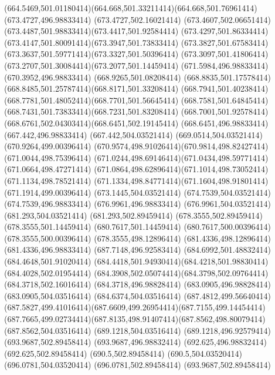 {{	\curveto(664.5469,501.01180414)(664.668,501.33211414)(664.668,501.76961414)
	\closepath
	\moveto(673.4727,496.98833414)
	\lineto(673.4727,502.16021414)
	\curveto(673.4607,502.06651414)(673.4487,501.98833414)(673.4417,501.92584414)
	\curveto(673.4297,501.86334414)(673.4147,501.80091414)(673.3947,501.73833414)
	\curveto(673.3827,501.67583414)(673.3637,501.59771414)(673.3327,501.50396414)
	\curveto(673.3097,501.41806414)(673.2707,501.30084414)(673.2077,501.14459414)
	\lineto(671.5984,496.98833414)
	\lineto(670.3952,496.98833414)
	\lineto(668.9265,501.08208414)
	\curveto(668.8835,501.17578414)(668.8485,501.25787414)(668.8171,501.33208414)
	\curveto(668.7941,501.40238414)(668.7781,501.48052414)(668.7701,501.56645414)
	\curveto(668.7581,501.64845414)(668.7431,501.73833414)(668.7231,501.83208414)
	\curveto(668.7001,501.92578414)(668.6761,502.04303414)(668.6451,502.19145414)
	\lineto(668.6451,496.98833414)
	\lineto(667.442,496.98833414)
	\lineto(667.442,504.03521414)
	\lineto(669.0514,504.03521414)
	\lineto(670.9264,499.00396414)
	\curveto(670.9574,498.91026414)(670.9814,498.82427414)(671.0044,498.75396414)
	\curveto(671.0244,498.69146414)(671.0434,498.59771414)(671.0664,498.47271414)
	\curveto(671.0864,498.62896414)(671.1014,498.73052414)(671.1134,498.78521414)
	\curveto(671.1334,498.84771414)(671.1604,498.91801414)(671.1914,499.00396414)
	\lineto(673.1445,504.03521414)
	\lineto(674.7539,504.03521414)
	\lineto(674.7539,496.98833414)
	\closepath
	\moveto(676.9961,496.98833414)
	\lineto(676.9961,504.03521414)
	\lineto(681.293,504.03521414)
	\lineto(681.293,502.89459414)
	\lineto(678.3555,502.89459414)
	\lineto(678.3555,501.14459414)
	\lineto(680.7617,501.14459414)
	\lineto(680.7617,500.00396414)
	\lineto(678.3555,500.00396414)
	\lineto(678.3555,498.12896414)
	\lineto(681.4336,498.12896414)
	\lineto(681.4336,496.98833414)
	\closepath
	\moveto(687.7148,496.92583414)
	\lineto(684.6992,501.48832414)
	\lineto(684.4648,501.91020414)
	\curveto(684.4418,501.94930414)(684.4218,501.98830414)(684.4028,502.01954414)
	\curveto(684.3908,502.05074414)(684.3798,502.09764414)(684.3718,502.16016414)
	\lineto(684.3718,496.98828414)
	\lineto(683.0905,496.98828414)
	\lineto(683.0905,504.03516414)
	\lineto(684.6374,504.03516414)
	\lineto(687.4812,499.56640414)
	\curveto(687.5827,499.41016414)(687.6609,499.26954414)(687.7155,499.14454414)
	\curveto(687.7665,499.02734414)(687.8135,498.91407414)(687.8562,498.80079414)
	\lineto(687.8562,504.03516414)
	\lineto(689.1218,504.03516414)
	\lineto(689.1218,496.92579414)
	\closepath
	\moveto(693.9687,502.89458414)
	\lineto(693.9687,496.98832414)
	\lineto(692.625,496.98832414)
	\lineto(692.625,502.89458414)
	\lineto(690.5,502.89458414)
	\lineto(690.5,504.03520414)
	\lineto(696.0781,504.03520414)
	\lineto(696.0781,502.89458414)
	\closepath
	\moveto(693.9687,502.89458414)
}
}
{
}

